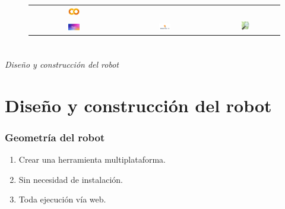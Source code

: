 \documentclass{beamer}
\begin{document}
\begin{frame}
\begin{figure}
\begin{tabular}{ccc}
		\includegraphics[width=0.14\textwidth]{figs/googlecolab.png} \\
		\includegraphics[width=0.14\textwidth]{figs/yolov8.png} &
		\includegraphics[width=0.14\textwidth]{figs/tflite.png} &
		\includegraphics[width=0.14\textwidth]{figs/osm.png}

	\end{tabular}
	\end{figure}	
\end{frame}


\section*{}
\begin{frame}{}
	\centering \Huge
	\emph{Diseño y construcción del robot}
\end{frame}

\section{Diseño y construcción del robot}
\begin{frame}
	\frametitle{Geometría del robot}
	\begin{enumerate}
		\item Crear una herramienta multiplataforma.
		\item Sin necesidad de instalación.
		\item Toda ejecución vía web.

	\end{enumerate}
\end{frame}
\end{document}
